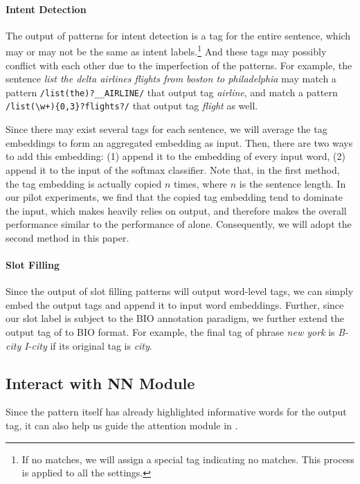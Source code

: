 \paragraph{Intent Detection}
The output of \RE patterns for intent detection is a tag for the entire sentence, which may or may not be the same as intent labels.\footnote{If no \RE matches, we will assign a special tag indicating no matches. This process is applied to all the settings.} 
And these tags may possibly conflict with each other due to the imperfection of the patterns. 
For example, the sentence \emph{list the delta airlines flights from boston to philadelphia} may match a pattern \texttt{/list(\;the)?\;\_\_AIRLINE/} that output tag \emph{airline}, 
and match a pattern \texttt{/list(\;\textbackslash w+)\{0,3\}?\;flights?/} that output tag \emph{flight} as well.

Since there may exist several tags for each sentence, we will average the tag embeddings to form an aggregated embedding as input. 
Then, there are two ways to add this embedding: (1) append it to the embedding of every input word, (2) append it to the input of the softmax classifier. Note that, in the first method, the tag embedding is actually copied $n$ times, where $n$ is the sentence length. In our pilot experiments, we find that the copied tag embedding tend to dominate the input, which makes \NN heavily relies on \RE output, and therefore makes the overall performance similar to the performance of \RE alone. Consequently, we will adopt the second method in this paper.

\paragraph{Slot Filling}
Since the output of slot filling \RE patterns will output word-level tags, we can simply embed the output tags and append it to input word embeddings. Further, since our slot label is subject to the BIO annotation paradigm, we further extend the output tag of \RE to BIO format. For example, the final \RE tag of phrase \emph{new york} is \emph{B-city I-city} if its original tag is \emph{city}.

\subsection{Interact with NN Module}
\label{interact_with_module}
Since the \RE pattern itself has already highlighted informative words for the output tag, it can also help us guide the attention module in \NN.
